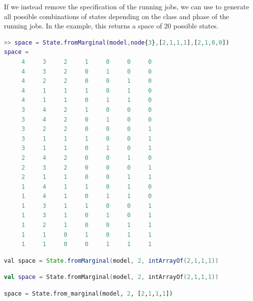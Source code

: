 If we instead remove the specification of the running jobs, we can use  to generate all possible combinations of states depending on the class and phase of the running jobs. In the example, this returns a space of 20 possible states.
\begin{MATLAB}
\begin{lstlisting}[language = matlab]
>> space = State.fromMarginal(model,node{3},[2,1,1,1],[2,1,0,0])
space =
     4     3     2     1     0     0     0
     4     3     2     0     1     0     0
     4     2     2     0     0     1     0
     4     1     1     1     0     1     0
     4     1     1     0     1     1     0
     3     4     2     1     0     0     0
     3     4     2     0     1     0     0
     3     2     2     0     0     0     1
     3     1     1     1     0     0     1
     3     1     1     0     1     0     1
     2     4     2     0     0     1     0
     2     3     2     0     0     0     1
     2     1     1     0     0     1     1
     1     4     1     1     0     1     0
     1     4     1     0     1     1     0
     1     3     1     1     0     0     1
     1     3     1     0     1     0     1
     1     2     1     0     0     1     1
     1     1     0     1     0     1     1
     1     1     0     0     1     1     1
\end{lstlisting}
\end{MATLAB}
\begin{JAVA}
\begin{lstlisting}[language=java, basicstyle=\ttfamily\scriptsize]
val space = State.fromMarginal(model, 2, intArrayOf(2,1,1,1))
\end{lstlisting}
\end{JAVA}
\begin{KOTLIN}
\begin{lstlisting}[language=kotlin, basicstyle=\ttfamily\scriptsize]
val space = State.fromMarginal(model, 2, intArrayOf(2,1,1,1))
\end{lstlisting}
\end{KOTLIN}
\begin{PYTHON}
\begin{lstlisting}[language=python]
space = State.from_marginal(model, 2, [2,1,1,1])
\end{lstlisting}
\end{PYTHON}
